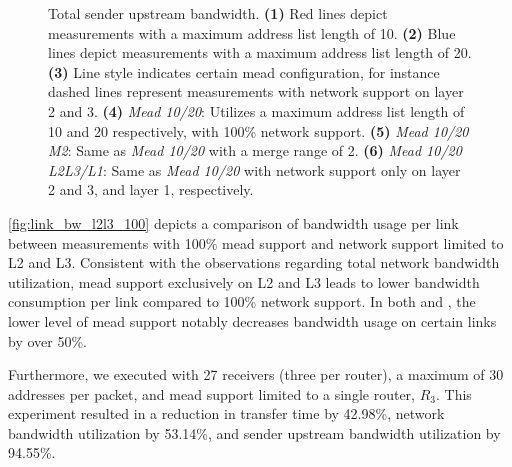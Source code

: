 \begin{figure}
    \begin{center}
        
    \end{center}
    \caption[Total sender upstream bandwidth]{
        Total sender upstream bandwidth.
        \textbf{(1)} Red lines depict measurements with a maximum address list length of 10.
        \textbf{(2)} Blue lines depict measurements with a maximum address list length of 20.
        \textbf{(3)} Line style indicates certain \gls{mead} configuration, for
            instance dashed lines represent measurements with network support
            on layer 2 and 3.
        \textbf{(4)} \textit{Mead 10/20}:
            Utilizes a maximum address list length of 10 and 20 respectively,
            with 100\% network support.
        \textbf{(5)} \textit{Mead 10/20 M2}:
            Same as \textit{Mead 10/20} with a merge range of 2.
        \textbf{(6)} \textit{Mead 10/20 L2L3/L1}:
            Same as \textit{Mead 10/20} with network support only on layer 2 and 3,
            and layer 1, respectively.
    }
    \label{fig:upstreamcmp}
\end{figure}

\autoref{fig:link_bw_l2l3_100} depicts a comparison of bandwidth usage per 
    link between measurements with 100\% \gls{mead} support and network support
    limited to L2 and L3.
Consistent with the observations regarding total network bandwidth utilization,
    \gls{mead} support exclusively on L2 and L3 leads to lower bandwidth
    consumption per link compared to 100\% network support.
In both \uci{} and \ucii{}, the lower level of \gls{mead} support notably
    decreases bandwidth usage on certain links by over 50\%.

    
Furthermore, we executed \ucii{} with 27 receivers (three per router), a
    maximum of 30 addresses per packet, and \gls{mead} support limited to a
    single router, $R_3$.
This experiment resulted in a reduction in transfer time by 42.98\%, network
    bandwidth utilization by 53.14\%, and sender upstream bandwidth utilization
    by 94.55\%.


